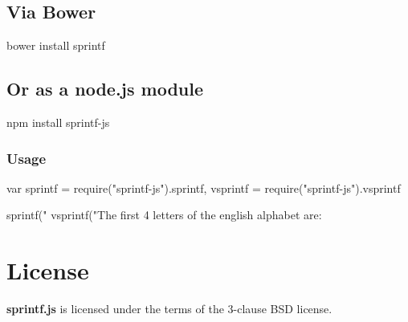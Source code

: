 \subsection*{Via Bower}

\begin{DoxyVerb}bower install sprintf
\end{DoxyVerb}


\subsection*{Or as a node.\+js module}

\begin{DoxyVerb}npm install sprintf-js
\end{DoxyVerb}


\subsubsection*{Usage}

\begin{DoxyVerb}var sprintf = require("sprintf-js").sprintf,
    vsprintf = require("sprintf-js").vsprintf

sprintf("%
vsprintf("The first 4 letters of the english alphabet are: %
\end{DoxyVerb}


\section*{License}

{\bfseries sprintf.\+js} is licensed under the terms of the 3-\/clause B\+S\+D license. 